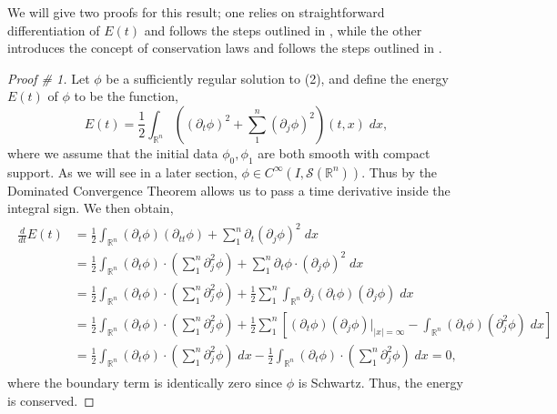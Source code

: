 \documentclass{article}
\begin{document}
\begin{remark}
		We will give two proofs for this result; one relies on straightforward differentiation of $E(t)$ and follows the steps outlined in \cite{Luk}, while the other introduces the concept of conservation laws and follows the steps outlined in \cite{Lawrie}. 
\end{remark}

\begin{proof}[Proof \# 1]
	Let $\phi$ be a sufficiently regular solution to (2), and define the energy $E(t)$ of $\phi$ to be the function, 
	\begin{equation*}
		E(t) = \frac{1}{2}\int_{\mathbb{R}^{n}}\left((\partial_{t}\phi)^{2} + \sum_{1}^{n}(\partial_{j}\phi)^{2}\right)(t, x)\;dx, 
	\end{equation*}
	where we assume that the initial data $\phi_{0}, \phi_{1}$ are both smooth with compact support. As we will see in a later section, $\phi \in C^{\infty}(I, \mathcal{S}(\mathbb{R}^{n}))$. Thus by the Dominated Convergence Theorem allows us to pass a time derivative inside the integral sign. We then obtain, 
	\begin{align*}
		\begin{split}
			\frac{d}{dt}E(t) &= \frac{1}{2}\int_{\mathbb{R}^{n}}(\partial_{t}\phi)(\partial_{tt}\phi) + \sum_{1}^{n}\partial_{t}(\partial_{j}\phi)^{2}\;dx \\
			&= \frac{1}{2}\int_{\mathbb{R}^{n}}(\partial_{t}\phi)\cdot \left(\sum_{1}^{n}\partial_{j}^{2}\phi\right) + \sum_{1}^{n}\partial_{t}\phi \cdot (\partial_{j}\phi)^{2}\;dx  \\
			&= \frac{1}{2}\int_{\mathbb{R}^{n}}(\partial_{t}\phi) \cdot \left(\sum_{1}^{n}\partial_{j}^{2}\phi\right) + \frac{1}{2}\sum_{1}^{n}\int_{\mathbb{R}^{n}}\partial_{j}(\partial_{t}\phi)(\partial_{j}\phi)\;dx  \\
			&= \frac{1}{2}\int_{\mathbb{R}^{n}}(\partial_{t}\phi) \cdot \left(\sum_{1}^{n}\partial_{j}^{2}\phi\right) + \frac{1}{2}\sum_{1}^{n}\left[(\partial_{t}\phi)(\partial_{j}\phi)\bigg|_{|x| = \infty} - \int_{\mathbb{R}^{n}}(\partial_{t}\phi)(\partial_{j}^{2} \phi)\;dx\right] \\
			&= \frac{1}{2}\int_{\mathbb{R}^{n}}(\partial_{t}\phi) \cdot \left(\sum_{1}^{n}\partial_{j}^{2}\phi\right)\;dx - \frac{1}{2}\int_{\mathbb{R}^{n}}(\partial_{t}\phi) \cdot \left(\sum_{1}^{n}\partial_{j}^{2}\phi\right)\;dx = 0, 
		\end{split}
	\end{align*}
	where the boundary term is identically zero since $\phi$ is Schwartz. Thus, the energy is conserved. 
\end{proof}
\end{document}
